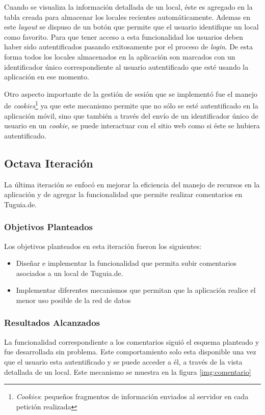 Cuando se visualiza la información detallada de un local, éste es agregado en la tabla creada para almacenar los locales recientes automáticamente. Ademas en este \textit{layout} se dispuso de un botón que permite que el usuario identifique un local como favorito. Para que tener acceso a esta funcionalidad los usuarios deben haber sido autentificados pasando exitosamente por el proceso de \textit{login}. De esta forma todos los locales almacenados en la aplicación son marcados con un identificador único correspondiente al usuario autentificado que esté usando la aplicación en ese momento. 

Otro aspecto importante de la gestión de sesión que se implementó fue el manejo de \textit{cookies}\footnote{\textit{Cookies}: pequeños fragmentos de información enviados al servidor en cada petición realizada} ya que este mecanismo permite que no sólo se esté autentificado en la aplicación móvil, sino que también a través del envío de un identificador único de usuario en un \textit{cookie}, se puede interactuar con el sitio web como si éste se hubiera autentificado.

\subsection{Octava Iteración}

La última iteración se enfocó en mejorar la eficiencia del manejo de recursos en la aplicación y de agregar la funcionalidad que permite realizar comentarios en Tuguia.de.

\subsubsection{Objetivos Planteados} 
Los objetivos planteados en esta iteración fueron los siguientes:
\begin{itemize}
\item Diseñar e implementar la funcionalidad que permita subir comentarios asociados a un local de Tuguia.de.
\item Implementar diferentes mecanismos que permitan que la aplicación realice el menor uso posible de la red de datos
\end{itemize}

\subsubsection{Resultados Alcanzados}

La funcionalidad correspondiente a los comentarios siguió el esquema planteado y fue desarrollada sin problema. Este comportamiento solo esta disponible una vez que el usuario esta autentificado y se puede acceder a él, a través de la vista detallada de un local. Este mecanismo se muestra en la figura \ref{img:comentario}

